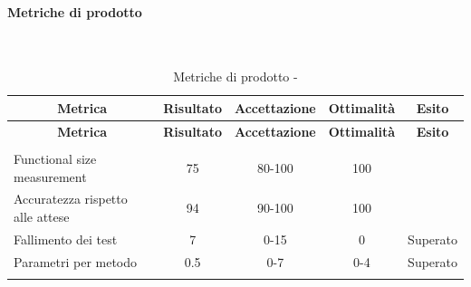 \paragraph{Metriche di prodotto}\mbox{}\\
\begin{longtable}{|m{5cm}|c|c|c|c|}
	\hline \multicolumn{1}{|c|}{\textbf{Metrica}} & \multicolumn{1}{c|}{\textbf{Risultato}} & \multicolumn{1}{c|}{\textbf{Accettazione}} & \multicolumn{1}{c|}{\textbf{Ottimalità}} & \multicolumn{1}{c|}{\textbf{Esito}}\\
	\hline 
	\endfirsthead
	
	\hline \multicolumn{1}{|c|}{\textbf{Metrica}} & \multicolumn{1}{c|}{\textbf{Risultato}} & \multicolumn{1}{c|}{\textbf{Accettazione}} & \multicolumn{1}{c|}{\textbf{Ottimalità}} & \multicolumn{1}{c|}{\textbf{Esito}}\\
	\hline 
	\endhead
	
	\hline \multicolumn{5}{|r|}{\ToBeContinued} \\ 
	\hline
	\endfoot
	
	\endlastfoot
	
	\hline Functional size measurement & 75 & 80-100 & 100 &  \\
	\hline Accuratezza rispetto alle attese & 94 & 90-100 & 100 & \\
	\hline Fallimento dei test & 7 & 0-15 & 0 & Superato \\
	\hline Parametri per metodo & 0.5 & 0-7 & 0-4 & Superato \\
	\hline
	\caption{Metriche di prodotto - \RA{}}
\end{longtable}